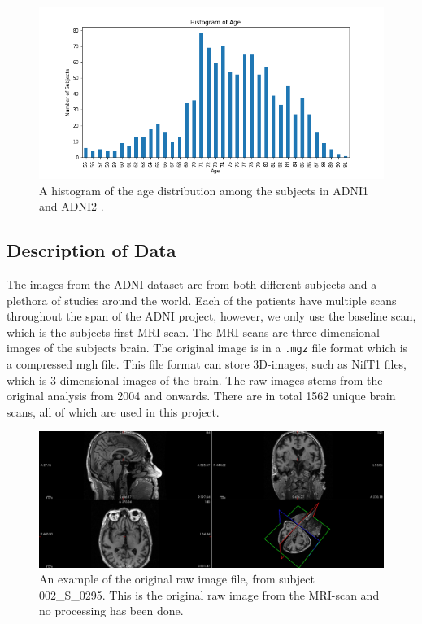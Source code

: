 \documentclass[12pt, fleqn, titlepage]{article}
\begin{document}
\begin{figure}[H]
	\centering
	\includegraphics[width=0.9\linewidth]{imgs/age_distro}
	\caption{A histogram of the age distribution among the subjects in ADNI1 and ADNI2 \cite{adni,adni1}.}
	\label{fig:age}
\end{figure}


\subsection{Description of Data} \label{dataDescription}


The images from the ADNI dataset are from both different subjects and a plethora of studies around the world.
Each of the patients have multiple scans throughout the span of the ADNI project, however, we only use the baseline scan, which is the subjects first MRI-scan. 
The MRI-scans are three dimensional images of the subjects brain. 
The original image is in a \texttt{.mgz} file format which is a compressed mgh file. 
This file format can store 3D-images, such as NifT1 files, which is 3-dimensional images of the brain. 
The raw images stems from the original analysis from 2004 and onwards. There are in total 1562 %
unique brain scans, all of which are used in this project.

\begin{figure}[H]
	\centering
	\includegraphics[width=0.95\linewidth]{mymans2}
	\caption{An example of the original raw image file, from subject 002\_S\_0295. This is the original raw image from the MRI-scan and no processing has been done.}
	\label{fig:screenshot001}
\end{figure}
\end{document}
